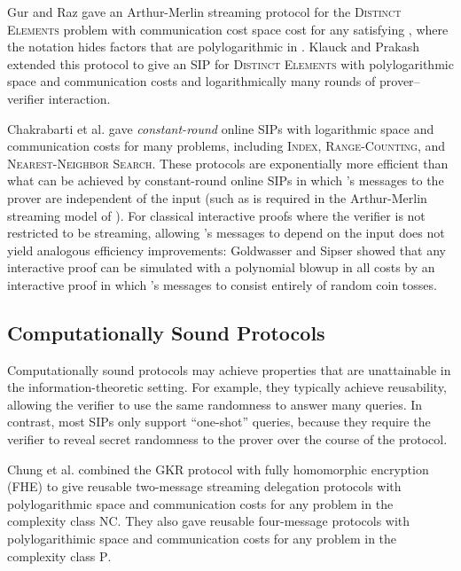 \documentclass[11pt, letterpaper]{article}
\begin{document}
Gur and Raz \cite{gur} gave an Arthur-Merlin streaming protocol for the \textsc{Distinct Elements} problem 
with communication cost  space cost  for any  satisfying , where the  notation hides factors that are polylogarithmic in . Klauck and Prakash \cite{prakashnew}
extended this protocol to give an SIP for \textsc{Distinct Elements} with polylogarithmic space and communication costs and logarithmically
many rounds of prover--verifier interaction. 

Chakrabarti et al. \cite{suresh} gave \emph{constant-round} online SIPs with logarithmic space and communication costs for many problems, including \textsc{Index}, \textsc{Range-Counting}, and \textsc{Nearest-Neighbor Search}. These protocols are exponentially more efficient than what can be achieved by constant-round online SIPs in which 's messages to the prover are independent of the input (such as is required in the Arthur-Merlin streaming model of \cite{gur}). 
For classical interactive proofs where the verifier is not restricted to be streaming, allowing 's messages to depend on the input does not yield analogous efficiency improvements: Goldwasser and Sipser \cite{goldwassersipser} showed that any interactive proof can be simulated with a polynomial blowup in all costs by an interactive proof in which 's messages to  consist entirely of random coin tosses.  





 
\subsection{Computationally Sound Protocols}
\label{sec:cs}
Computationally sound protocols may achieve properties that are unattainable in the information-theoretic setting. For example, they
typically achieve reusability, allowing the verifier to use the same randomness to answer many queries. In
contrast, most SIPs only support ``one-shot'' queries, because they require the verifier to reveal secret
randomness to the prover over the course of the protocol.

Chung et al. \cite{chung} combined the GKR protocol with fully homomorphic encryption (FHE) to give reusable
two-message streaming delegation protocols with polylogarithmic space and communication costs for any problem in the complexity class \textsc{NC}. They
 also gave reusable four-message protocols with polylogarithimic space and communication costs for any problem in the complexity class \textsc{P}. 
 
\end{document}
